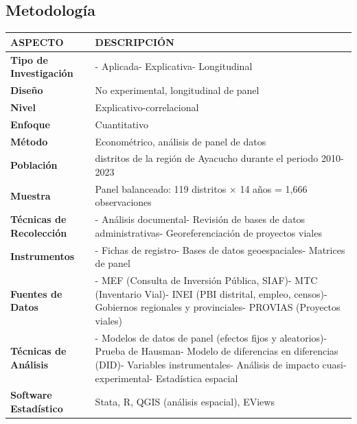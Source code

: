\documentclass[
  man,
  floatsintext,
  longtable,
  a4paper,
  nolmodern,
  notxfonts,
  notimes,
  12pt,
  colorlinks=true,linkcolor=blue,citecolor=blue,urlcolor=blue]{apa7}
\newcounter{none} %
\begin{document}
\subsection{Metodología}\label{metodologuxeda-3}

{\def\LTcaptype{none} %
\begin{longtable}[]{@{}
  >{\raggedright\arraybackslash}p{}
  >{\raggedright\arraybackslash}p{}@{}}
\toprule\noalign{}
\begin{minipage}[b]{\linewidth}\raggedright
ASPECTO
\end{minipage} & \begin{minipage}[b]{\linewidth}\raggedright
DESCRIPCIÓN
\end{minipage} \\
\midrule\noalign{}
\endhead
\bottomrule\noalign{}
\endlastfoot
\textbf{Tipo de Investigación} & - Aplicada- Explicativa-
Longitudinal \\
\textbf{Diseño} & No experimental, longitudinal de panel \\
\textbf{Nivel} & Explicativo-correlacional \\
\textbf{Enfoque} & Cuantitativo \\
\textbf{Método} & Econométrico, análisis de panel de datos \\
\textbf{Población} & 119 distritos de la región de Ayacucho durante el
periodo 2010-2023 \\
\textbf{Muestra} & Panel balanceado: 119 distritos × 14 años = 1,666
observaciones \\
\textbf{Técnicas de Recolección} & - Análisis documental- Revisión de
bases de datos administrativas- Georeferenciación de proyectos viales \\
\textbf{Instrumentos} & - Fichas de registro- Bases de datos
geoespaciales- Matrices de panel \\
\textbf{Fuentes de Datos} & - MEF (Consulta de Inversión Pública, SIAF)-
MTC (Inventario Vial)- INEI (PBI distrital, empleo, censos)- Gobiernos
regionales y provinciales- PROVIAS (Proyectos viales) \\
\textbf{Técnicas de Análisis} & - Modelos de datos de panel (efectos
fijos y aleatorios)- Prueba de Hausman- Modelo de diferencias en
diferencias (DID)- Variables instrumentales- Análisis de impacto
cuasi-experimental- Estadística espacial \\
\textbf{Software Estadístico} & Stata, R, QGIS (análisis espacial),
EViews \\
\end{longtable}
}
\end{document}
